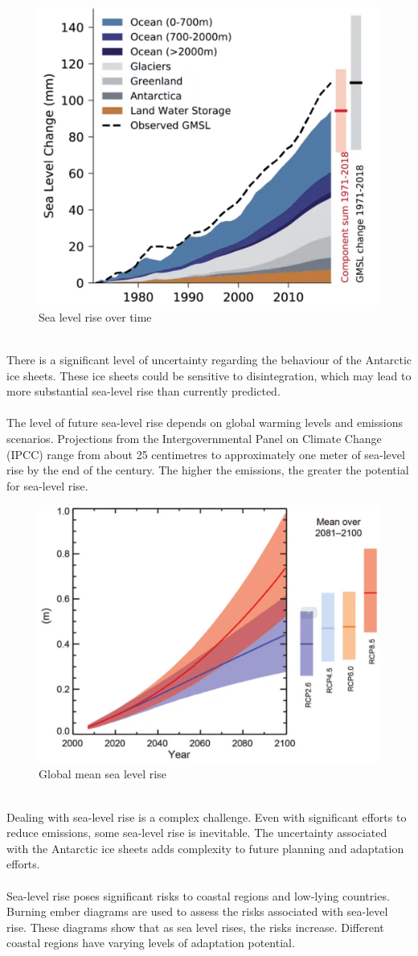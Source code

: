 \documentclass[../summary.tex]{subfiles}
\begin{document}
\begin{figure}[H]
	\centering
	\includegraphics[width=0.57\linewidth]{../images/sea_level_rise}
	\caption{Sea level rise over time}
	\label{fig:sealevelrise}
\end{figure}
\ \\
There is a significant level of uncertainty regarding the behaviour of the Antarctic ice sheets. These ice sheets could be sensitive to disintegration, which may lead to more substantial sea-level rise than currently predicted.\\
\\
The level of future sea-level rise depends on global warming levels and emissions scenarios. Projections from the Intergovernmental Panel on Climate Change (IPCC) range from about 25 centimetres to approximately one meter of sea-level rise by the end of the century. The higher the emissions, the greater the potential for sea-level rise.

\begin{figure}[H]
	\centering
	\includegraphics[width=0.6\linewidth]{../images/global_mean_sea_level_rise}
	\caption{Global mean sea level rise}
	\label{fig:globalmeansealevelrise}
\end{figure}
\ \\
Dealing with sea-level rise is a complex challenge. Even with significant efforts to reduce emissions, some sea-level rise is inevitable. The uncertainty associated with the Antarctic ice sheets adds complexity to future planning and adaptation efforts.\\
\\
Sea-level rise poses significant risks to coastal regions and low-lying countries. Burning ember diagrams are used to assess the risks associated with sea-level rise. These diagrams show that as sea level rises, the risks increase. Different coastal regions have varying levels of adaptation potential.
\end{document}
